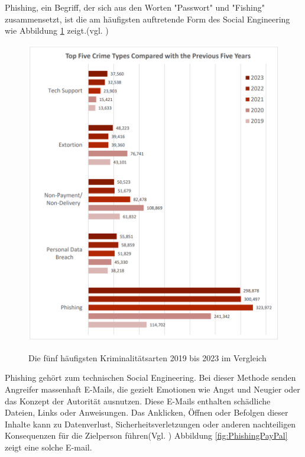 Phishing, ein Begriff, der sich aus den Worten "Passwort" und "Fishing" zusammensetzt, ist die am häufigsten auftretende Form des Social Engineering wie Abbildung \ref{fig:CrimeVergleich} zeigt.(vgl. \cite{bsi1})

\begin{figure}[h]
    \centering
\includegraphics[width = 12cm]{figures/FBICrimeVergleich.png}
\caption{Die fünf häufigsten Kriminalitätsarten 2019 bis 2023 im Vergleich}
\cite{fbi}
\label{fig:CrimeVergleich}
\end{figure}

Phishing gehört zum technischen Social Engineering. Bei dieser Methode senden Angreifer massenhaft E-Mails, die gezielt Emotionen wie Angst und Neugier oder das Konzept der Autorität ausnutzen. Diese E-Mails enthalten schädliche Dateien, Links oder Anweisungen. Das Anklicken, Öffnen oder Befolgen dieser Inhalte kann zu Datenverlust, Sicherheitsverletzungen oder anderen nachteiligen Konsequenzen für die Zielperson führen(Vgl. \cite{phishing}) Abbildung \ref{fig:PhishingPayPal} zeigt eine solche E-mail.


